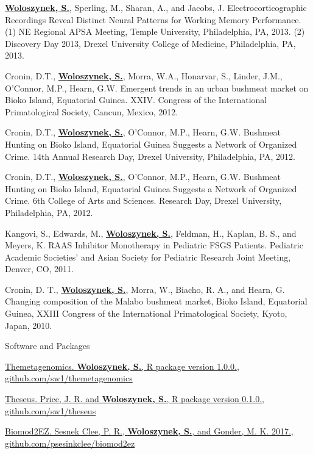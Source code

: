 \begin{cventries}
{\begin{cvitems}
        \item{\textbf{\underline{Woloszynek, S.}}, Sperling, M., Sharan, A., and Jacobs, J. Electrocorticographic Recordings Reveal Distinct Neural Patterns for Working Memory Performance. (1) NE Regional APSA Meeting, Temple University, Philadelphia, PA, 2013. (2) Discovery Day 2013, Drexel University College of Medicine, Philadelphia, PA, 2013.}
        \item{Cronin, D.T., \textbf{\underline{Woloszynek, S.}}, Morra, W.A., Honarvar, S., Linder, J.M., O’Connor, M.P., Hearn, G.W. Emergent trends in an urban bushmeat market on Bioko Island, Equatorial Guinea. XXIV. Congress of the International Primatological Society, Cancun, Mexico, 2012.}
        \item{Cronin, D.T., \textbf{\underline{Woloszynek, S.}}, O’Connor, M.P., Hearn, G.W. Bushmeat Hunting on Bioko Island, Equatorial Guinea Suggests a Network of Organized Crime. 14th Annual Research Day, Drexel University, Philadelphia, PA, 2012.}
        \item{Cronin, D.T., \textbf{\underline{Woloszynek, S.}}, O’Connor, M.P., Hearn, G.W. Bushmeat Hunting on Bioko Island, Equatorial Guinea Suggests a Network of Organized Crime. 6th College of Arts and Sciences. Research Day, Drexel University, Philadelphia, PA, 2012.}
        \item{Kangovi, S., Edwards, M., \textbf{\underline{Woloszynek, S.}}, Feldman, H., Kaplan, B. S., and Meyers, K. RAAS Inhibitor Monotherapy in Pediatric FSGS Patients. Pediatric Academic Societies' and Asian Society for Pediatric Research Joint Meeting, Denver, CO, 2011.}
        \item{Cronin, D. T., \textbf{\underline{Woloszynek, S.}}, Morra, W., Biacho, R. A., and Hearn, G. Changing composition of the Malabo bushmeat market, Bioko Island, Equatorial Guinea, XXIII Congress of the International Primatological Society, Kyoto, Japan, 2010.}
      \end{cvitems}
    }
    
\vspace{.5cm}
\cventry
    {}
    {Software and Packages}
    {}
    {}
    {
     \begin{cvitems} %
        \item{\href{https://cran.r-project.org/package=themetagenomics}{Themetagenomics. \textbf{\underline{Woloszynek, S.}}, R package version 1.0.0.}, \href{https://github.com/sw1/themetagenomics}{github.com/sw1/themetagenomics}}
        \item{\href{https://cran.r-project.org/package=theseus}{Theseus. Price, J. R. and \textbf{\underline{Woloszynek, S.}}, R package version 0.1.0.}, \href{https://github.com/sw1/theseus/}{github.com/sw1/theseus}}
	\item{\href{https://doi.org/10.1101/140855}{Biomod2EZ. Sesnek Clee, P. R., \textbf{\underline{Woloszynek, S.}}, and Gonder, M. K. 2017.}, \href{https://github.com/spsesinkclee/biomod2ez/}{github.com/psesinkclee/biomod2ez}}
      \end{cvitems}
    }
    

\end{cventries}
